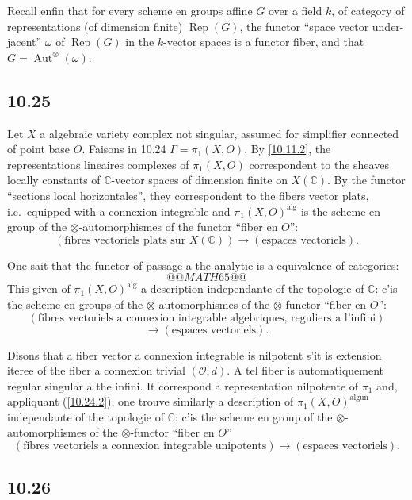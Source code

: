 \documentclass[12pt,a4paper]{article}
\theoremstyle{plain}
\theoremstyle{definition}
\theoremstyle{remark}
\DeclareMathOperator{\Aut}{Aut}
\DeclareMathOperator{\Rep}{Rep}
\newcommand{\C}{\mathbb{C}}
\newcommand{\alg}{\mathrm{alg}}
\newcommand{\un}{\mathrm{un}}
\begin{document}
Recall enfin that for every scheme en groups affine $G$ over a field $k$, of category of representations (of dimension finite) $\Rep(G)$, the functor ``space vector under-jacent'' $\omega$ of $\Rep(G)$ in the $k$-vector spaces is a functor fiber, and that $G = \Aut^{\otimes}(\omega)$.

\subsection*{10.25}

Let $X$ a algebraic variety complex not singular, assumed for simplifier connected of point base $O$. Faisons in 10.24 $\Gamma = \pi_1(X, O)$. By \ref{10.11.2}, the representations lineaires complexes of $\pi_1(X, O)$ correspondent to the sheaves locally constants of $\C$-vector spaces of dimension finite on $X(\C)$. By the functor ``sections local horizontales'', they correspondent to the fibers vector plats, i.e.~equipped with a connexion integrable and $\pi_1(X, O)^{\alg}$ is the scheme en group of the $\otimes$-automorphismes of the functor ``fiber en $O$'':
$$(\text{fibres vectoriels plats sur } X(\C)) \longrightarrow (\text{espaces vectoriels}).$$

One sait that the functor of passage a the analytic is a equivalence of categories:
$$@@MATH65@@$$
This given of $\pi_1(X, O)^{\alg}$ a description independante of the topologie of $\C$: c'is the scheme en groups of the $\otimes$-automorphismes of the $\otimes$-functor ``fiber en $O$'':
$$(\text{fibres vectoriels a connexion integrable algebriques, reguliers a l'infini})$$
$$\longrightarrow (\text{espaces vectoriels}).$$

Disons that a fiber vector a connexion integrable is nilpotent s'it is extension iteree of the fiber a connexion trivial $(\mathcal{O}, d)$. A tel fiber is automatiquement regular singular a the infini. It correspond a representation nilpotente of $\pi_1$ and, appliquant (\ref{10.24.2}), one trouve similarly a description of $\pi_1(X, O)^{\alg \un}$ independante of the topologie of $\C$: c'is the scheme en group of the $\otimes$-automorphismes of the $\otimes$-functor ``fiber en $O$''
$$(\text{fibres vectoriels a connexion integrable unipotents}) \longrightarrow (\text{espaces vectoriels}).$$

\subsection*{10.26}
\end{document}

